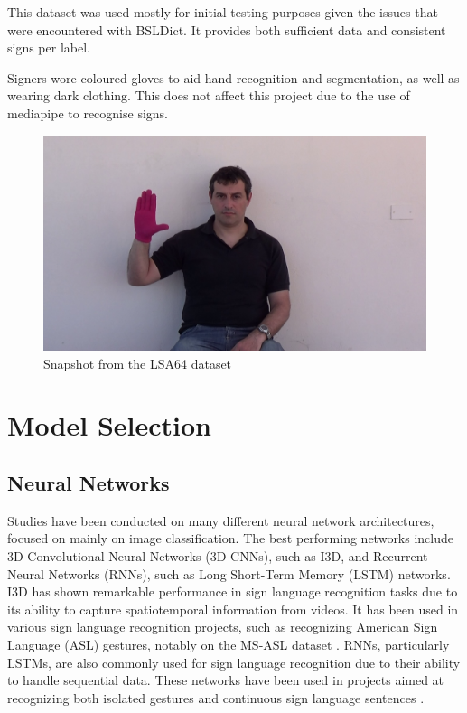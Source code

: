 \documentclass[final,rdr32.tex]{subfiles}
\begin{document}
This dataset was used mostly for initial testing purposes given the issues that were encountered with BSLDict. It provides both sufficient data and consistent signs per label.

Signers wore coloured gloves to aid hand recognition and segmentation, as well as wearing dark clothing. This does not affect this project due to the use of mediapipe to recognise signs.


\begin{figure}[H]
    \begin{center}
        \includegraphics[scale=0.15]{images/LSA64.png}
        \caption[caption]{Snapshot from the LSA64 dataset}
    \end{center}
\end{figure}

\section{Model Selection}

\subsection{Neural Networks}

Studies have been conducted on many different neural network architectures, focused
on mainly on image classification. The best performing networks include 3D Convolutional Neural Networks (3D CNNs), such as I3D, and Recurrent Neural Networks (RNNs), such as Long Short-Term Memory (LSTM) networks. I3D has shown remarkable performance in sign language recognition tasks due to its ability to capture spatiotemporal information from videos. It has been used in various sign language recognition projects, such as recognizing American Sign Language (ASL) gestures, notably on the MS-ASL dataset \cite{joze2018ms}. RNNs, particularly LSTMs, are also commonly used for sign language recognition due to their ability to handle sequential data. These networks have been used in projects aimed at recognizing both isolated gestures \cite{liu2016sign} and continuous sign language sentences \cite{guo2018hierarchical}.
\end{document}
